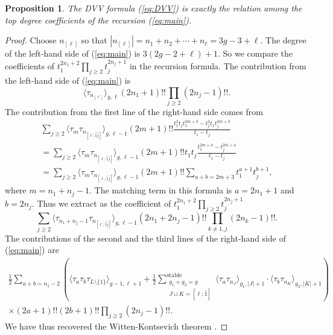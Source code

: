 \documentclass{amsart}
\newtheorem{prop}[thm]{Proposition}
\theoremstyle{definition}
\numberwithin{equation}{section}
\numberwithin{figure}{section}
\newcommand{\la}{{\langle}}
\newcommand{\ra}{{\rangle}}
\newcommand{\half}{{\frac{1}{2}}}
\begin{document}
 



\begin{prop}
\label{prop:WK}
The DVV formula {\rm(\ref{eq:DVV})} is exactly the 
relation among the top degree coefficients
of the recursion {\rm(\ref{eq:main})}.
\end{prop}





\begin{proof}
Choose $n_{[\ell]}$ so that 
$|n_{[\ell]}|= n_1+n_2+\cdots +n_\ell=3g-3+\ell$.
The degree of the left-hand side of (\ref{eq:main}) is $3(2g-2+\ell) +1$. 
So we
 compare the coefficients of $t_1 ^{2n_1+2}\prod_{j\ge 2} t_j ^{2n_j+1}$
in the recursion formula. 
The contribution from the left-hand side of (\ref{eq:main}) is 
$$
\la \tau_{n_{[\ell]}}\ra _{g,\ell}
(2n_1+1)!!\prod_{j\ge 2} (2n_j-1)!!.
$$
The contribution from the first line of the right-hand side comes from
\begin{multline*}
\sum_{j\ge 2}
\la\tau_m\tau_{n_{[\ell;\hat{1}\hat{j}]}}\ra_{g,\ell-1}
(2m+1)!! 
 \frac{t_1^2 t_j t_1 ^{2m+3}
-t_j^2t_1t_j ^{2m+3}}{t_1-t_j}
\\
=
\sum_{j\ge 2}
\la\tau_m\tau_{n_{[\ell;\hat{1}\hat{j}]}}\ra_{g,\ell-1}
(2m+1)!! t_1t_j
 \frac{ t_1 ^{2m+4}
-t_j ^{2m+4}}{t_1-t_j}
\\
=
\sum_{j\ge 2}
\la\tau_m\tau_{n_{[\ell;\hat{1}\hat{j}]}}\ra_{g,\ell-1}
(2m+1)!!
\sum_{a+b=2m+3}t_1 ^{a+1}t_j ^{b+1},
\end{multline*}
where $m=n_1+n_j-1$. The matching term in this
formula is $a=2n_1+1$ and $b=2n_j$. Thus we extract
as the coefficient of $t_1 ^{2n_1+2}\prod_{j\ge 2} t_j ^{2n_j+1}$
$$
\sum_{j\ge 2}
\la\tau_{n_1+n_j-1}\tau_{n_{[\ell;\hat{1}\hat{j}]}}\ra_{g,\ell-1}
(2n_1+2n_j-1)!!\prod_{k\ne 1,j}(2n_k-1)!!.
$$
The contributions of the second and the third lines 
of the right-hand side  of (\ref{eq:main}) are
\begin{multline*}
\half
\sum_{a+b=n_1-2}
\left(
\la \tau_a \tau_b \tau_{L\setminus \{1\}}\ra_{g-1,\ell+1}
+\frac{1}{2}
\sum_{\substack{g_1+g_2=g\\
J\sqcup K= [\ell;\hat{1}]}} ^{
\text{stable}}
\la \tau_a\tau_{n_J}\ra _{g_1,|J|+1}\cdot
\la \tau_b\tau_{n_K}\ra _{g_2,|K|+1}
\right)
\\
\times
(2a+1)!!(2b+1)!!\prod_{j\ge 2}(2n_j-1)!!.
\end{multline*}
We have thus recovered the Witten-Kontsevich theorem
\cite{DVV, K1992, W1991}.
\end{proof}
\end{document}
